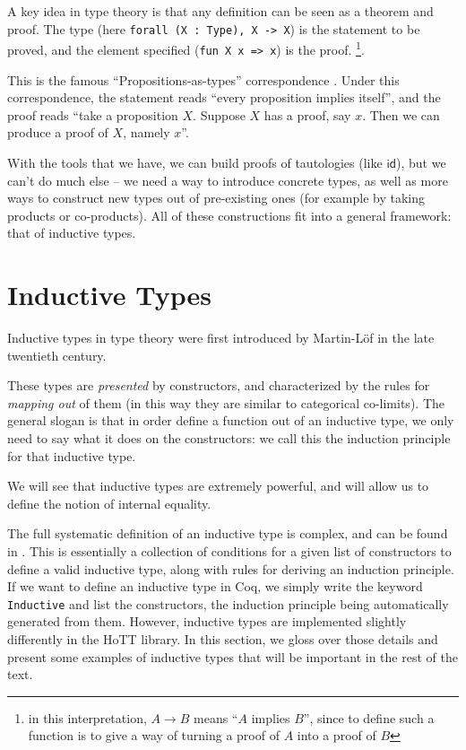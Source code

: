 \documentclass[12 pt]{amsart}
\theoremstyle{definition}
\theoremstyle{remark}
\newcommand{\id}{{\mathsf{id}}}
\begin{document}
A key idea in type theory is that any definition can be seen as a theorem and proof. The type (here \texttt{forall (X : Type), X -> X}) is the statement to be proved, and the element specified (\texttt{fun X x => x}) is the proof. \footnote{in this interpretation, $A\to B$ means ``$A$ implies $B$'', since to define such a function is to give a way of turning a proof of $A$ into a proof of $B$}.

This is the famous ``Propositions-as-types'' correspondence \cite[Section 1.11]{hottbook}. Under this correspondence, the statement reads ``every proposition implies itself'', and the proof reads ``take a proposition $X$. Suppose $X$ has a proof, say $x$. Then we can produce a proof of $X$, namely $x$''.


With the tools that we have, we can build proofs of tautologies (like $\id$), but we can't do much else -- we need a way to introduce concrete types, as well as more ways to construct new types out of pre-existing ones (for example by taking products or co-products). All of these constructions fit into a general framework: that of inductive types.


\section{Inductive Types}

Inductive types in type theory were first introduced by Martin-Löf \cite{martinlof1984} in the late twentieth century.

These types are \textit{presented} by constructors, and characterized by the rules for \textit{mapping out} of them (in this way they are similar to categorical co-limits). The general slogan is that in order define a function out of an inductive type, we only need to say what it does on the constructors: we call this the induction principle for that inductive type.

We will see that inductive types are extremely powerful, and will allow us to define the notion of internal equality. 

The full systematic definition of an inductive type is complex, and can be found in \cite[Inductive types]{coq-refman-8.19}. This is essentially a collection of conditions for a given list of constructors to define a valid inductive type, along with rules for deriving an induction principle. If we want to define an inductive type in Coq, we simply write the keyword \texttt{Inductive} and list the constructors, the induction principle being automatically generated from them. However, inductive types are implemented slightly differently in the HoTT library. In this section, we gloss over those details and present some examples of inductive types that will be important in the rest of the text.
\end{document}
